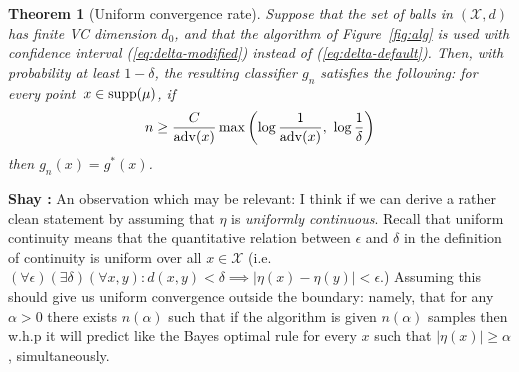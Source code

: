 \documentclass{article}
\def\X{{\mathcal X}}
\def\supp{{\rm supp}}
\def\adv{{\rm adv}}
\newcommand{\eps}{\epsilon}
\newtheorem{theorem}{Theorem}
\newcommand{\comment}[3]{{\color{#1} {\bf #2 :} #3}}
\newcommand{\shay}[1]{\comment{purple}{Shay}{#1}}
\begin{document}


\begin{theorem} [Uniform convergence rate]
Suppose that the set of balls in $(\X,d)$ has finite VC dimension $d_0$, and that the algorithm of Figure~\ref{fig:alg} is used with confidence interval (\ref{eq:delta-modified}) instead of (\ref{eq:delta-default}). 
Then, with probability at least $1-\delta$, the resulting classifier $g_n$ satisfies the following: 
for every point~$x\in\supp(\mu)$, if
\[n \geq \frac{C}{\adv(x)} \max \left( \log \frac{1}{\adv(x)}, \ \log \frac{1}{\delta} \right)\]
then $g_n(x)=g^*(x)$.
\label{thm:uniform-rate}
\end{theorem}

\shay{An observation which may be relevant: 
I think if we can derive a rather clean statement by assuming that $\eta$ is {\it uniformly continuous}.
Recall that uniform continuity means that the quantitative relation between $\eps$ and $\delta$
in the definition of continuity is uniform over all $x\in \X$ 
(i.e.\ $(\forall \epsilon)(\exists\delta)(\forall x,y):d(x,y)<\delta \implies \lvert\eta(x)-\eta(y) \rvert<\epsilon$.)
Assuming this should give us uniform convergence outside the boundary:
namely, that for any $\alpha>0$ there exists $n(\alpha)$ 
such that if the algorithm is given $n(\alpha)$ samples then w.h.p it will predict like the Bayes optimal rule
for every $x$ such that $\lvert\eta(x)\rvert \geq \alpha$, simultaneously. }
\end{document}
